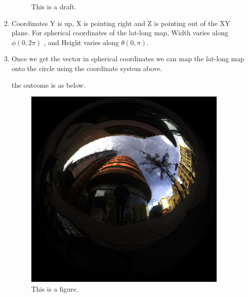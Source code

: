 \documentclass[12pt,twoside]{article}
\begin{document}
\begin{enumerate}[1)]
\begin{figure}[H]
        \caption{This is a draft.} %
        \label{fig:imperial figure} %
    \end{figure}
        
        \item Coordinates Y is up, X is pointing right and Z is pointing out of the XY plane. For spherical coordinates of the lat-long map, Width varies along $\phi (0 , 2\pi)$ , and Height varies along $\theta (0 ,\pi)$.
        \item Once we get the vector in spherical coordinates we can map the lat-long map onto the circle using the coordinate system above.
        
        the outcome is as below.
        \begin{figure}[H]
          \centering %
            \includegraphics[width= 10cm, height= 10cm]{./figures/result2.jpg} 
            \caption{This is a figure.} %
            \label{fig:imperial figure} %
        \end{figure}
        

\end{enumerate}
\end{document}
